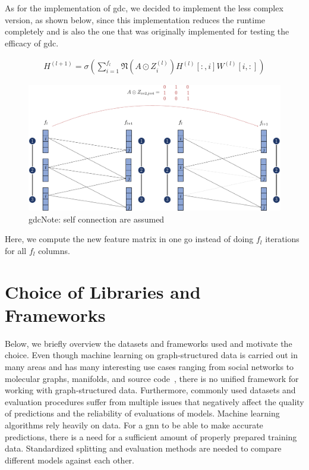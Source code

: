 As for the implementation of \ac{gdc}, we decided to implement the less complex version, as shown below, since this implementation reduces the runtime completely and is also the one that was originally implemented for testing the efficacy of \ac{gdc}.

\begin{align}
    H^{(l+1)} = \sigma(\sum_{i= 1}^{f_{l}}\mathfrak{N}(A \odot Z_{i}^{(l)})H^{(l)}[:,i] W^{(l)}[i,:]) \label{eq:relaxed}
\end{align}
\begin{figure}[ht]
    \centering
    \includegraphics[width= 0.90\linewidth]{gfx/implementation/GDC-eq4.pdf}
    \caption{\Ac{gdc}Note: self connection are assumed}\label{fig:implementaion:GDC-eq4}
\end{figure}
Here, we compute the new feature matrix in one go instead of doing $f_{l}$ iterations for all $f_{l}$ columns.


\section{Choice of Libraries and Frameworks}
\label{sec:implement:frameworks}
Below, we briefly overview the datasets and frameworks used and motivate the choice.
Even though machine learning on graph-structured data is carried out in many areas and has many interesting use cases ranging from social networks to molecular graphs, manifolds, and source code~\cite{Hu2020},
there is no unified framework for working with graph-structured data.
Furthermore, commonly used datasets and evaluation procedures suffer from multiple issues that negatively affect the quality of predictions and the reliability of evaluations of models.
Machine learning algorithms rely heavily on data. For a \ac{gnn} to be able to make accurate predictions, there is a need for a sufficient amount of properly prepared training data. Standardized splitting and evaluation methods are needed to compare different models against each other.

